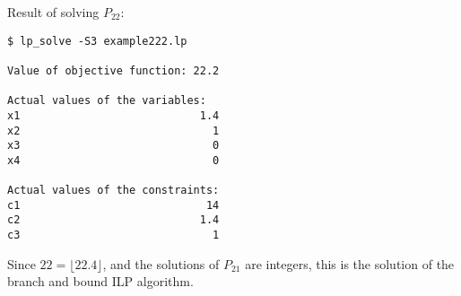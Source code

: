 \documentclass[a4paper, oneside]{scrartcl}
\begin{document}
\begin{enumerate}
Result of solving $P_{22}$:
\begin{verbatim}
$ lp_solve -S3 example222.lp 

Value of objective function: 22.2

Actual values of the variables:
x1                            1.4
x2                              1
x3                              0
x4                              0

Actual values of the constraints:
c1                             14
c2                            1.4
c3                              1
\end{verbatim}

Since $22 = \lfloor 22.4 \rfloor$, and the solutions of $P_{21}$ are integers,
this is the solution of the branch and bound ILP algorithm.
\end{enumerate}
\end{document}

